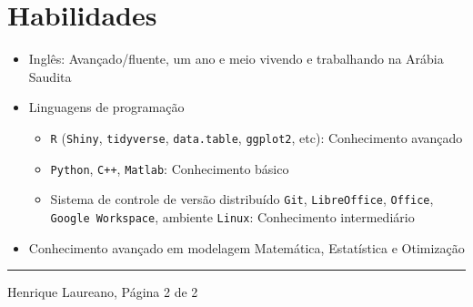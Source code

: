 \documentclass[12pt]{article}
\newcommand{\horrule}[1]{\noindent\rule{\linewidth}{#1}}
\begin{document}
\section*{Habilidades}

\begin{itemize}
 \item Ingl\^{e}s: Avan\c{c}ado/fluente, um ano e meio vivendo e
       trabalhando na Ar\'{a}bia Saudita
 \item Linguagens de programa\c{c}\~{a}o
  \begin{itemize}
   \item \texttt{R} (\texttt{Shiny}, \texttt{tidyverse},
                     \texttt{data.table}, \texttt{ggplot2}, etc):
         Conhecimento avan\c{c}ado
   \item \texttt{Python}, \texttt{C++}, \texttt{Matlab}: Conhecimento
          b\'{a}sico
   \item Sistema de controle de vers\~{a}o distribu\'{i}do \texttt{Git},
         \texttt{LibreOffice}, \texttt{Office},
         \texttt{Google Workspace}, ambiente \texttt{Linux}:
         Conhecimento intermedi\'{a}rio
  \end{itemize}
 \item Conhecimento avan\c{c}ado em modelagem Matem\'{a}tica,
       Estat\'{i}stica e Otimiza\c{c}\~{a}o
\end{itemize}

\vspace{\fill}
\horrule{1pt}
\noindent Henrique Laureano, \hfill P\'{a}gina 2 de 2
\end{document}
